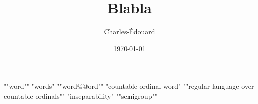 \documentclass{article}
\title{Blabla}
\date{\today}
\author{Charles-Édouard}
\begin{document}
\maketitle

\AP ""word""
"words"
""word@@ord""
"countable ordinal word"
""regular language over countable ordinals""
"inseparability"
""semigroup""
\end{document}
